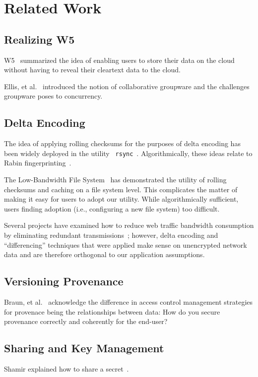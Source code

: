 \section{Related Work}

\subsection{Realizing W5}
W5~\cite{w5} summarized the idea of enabling users to store their data
on the cloud without having to reveal their cleartext data to the
cloud.

Ellis, et al.~\cite{groupware} introduced the notion of collaborative
groupware and the challenges groupware poses to concurrency.

\subsection{Delta Encoding}
The idea of applying rolling checksums for the purposes of delta
encoding has been widely deployed in the utility {\tt
  rsync}~\cite{rsync}. Algorithmically, these ideas relate to Rabin
fingerprinting~\cite{rabinfp}.

The Low-Bandwidth File System~\cite{lbfs} has demonstrated the utility
of rolling checksums and caching on a file system level. This
complicates the matter of making it easy for users to adopt our
utility. While algorithmically sufficient, users finding adoption
(i.e., configuring a new file system) too difficult.

Several projects have examined how to reduce web traffic bandwidth
consumption by eliminating redundant transmissions~\cite{wetherall,
  webexpress}; however, delta encoding and ``differencing'' techniques
that were applied make sense on unencrypted network data and are
therefore orthogonal to our application assumptions. 

\subsection{Versioning Provenance}

Braun, et al.~\cite{securingprovenance} acknowledge the difference in
access control management strategies for provenace being the
relationships between data: How do you secure provenance correctly and
coherently for the end-user?

\subsection{Sharing and Key Management}
Shamir explained how to share a secret~\cite{shamir}.

